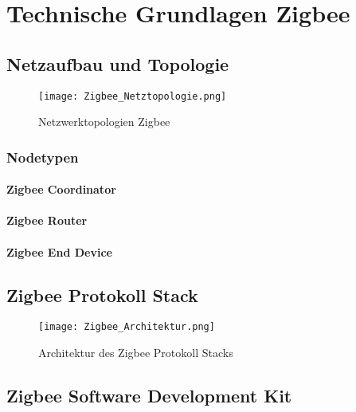 \clearpage
\section{Technische Grundlagen Zigbee}\label{sec:TechnischeGrundlagenZigbee}

\subsection{Netzaufbau und Topologie}\label{subsec:NetzaufbauundTopologie}

\begin{figure}[h]
	\centering
	\texttt{[image: Zigbee\_Netztopologie.png]}
	\caption{Netzwerktopologien Zigbee \cite{markus_krause_rainer_konrad_drahtlose_2014}}
	\label{fig:NetzwerktopologienZigbee}
\end{figure}

\subsubsection{Nodetypen}\label{subsubsec:Nodetypen}
\paragraph{Zigbee Coordinator}\label{para:ZigbeeCoordinator}

\paragraph{Zigbee Router}\label{para:ZigbeeRouter}

\paragraph{Zigbee End Device}\label{para:ZigbeeEndDevice}





\subsection{Zigbee Protokoll Stack}\label{subsec:ZigbeeProtokollStack}

\begin{figure}[h]
	\centering
	\texttt{[image: Zigbee\_Architektur.png]}
	\caption{Architektur des Zigbee Protokoll Stacks \cite{markus_krause_rainer_konrad_drahtlose_2014}}
	\label{fig:ArchitekturdesZigbeeProtokollStacks}
\end{figure}

\subsection{Zigbee Software Development Kit}\label{subsec:ZigbeeSoftwareDevelopmentKit}
